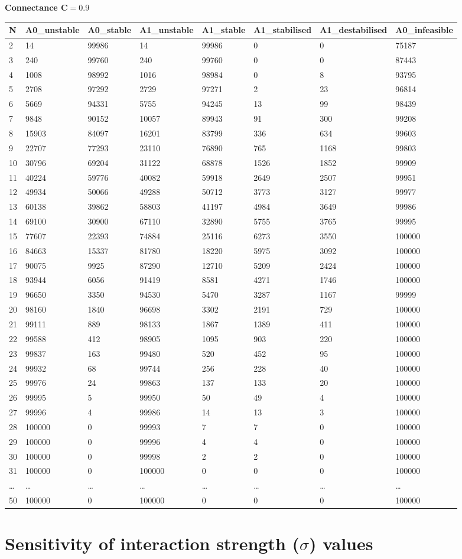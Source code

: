 \documentclass[]{article}
\begin{document}
\textbf{Connectance \(\mathbf{C = 0.9}\)}

\begin{longtable}[]{@{}llllllll@{}}
\toprule
N & A0\_unstable & A0\_stable & A1\_unstable & A1\_stable &
A1\_stabilised & A1\_destabilised & A0\_infeasible\tabularnewline
\midrule
\endhead
2 & 14 & 99986 & 14 & 99986 & 0 & 0 & 75187\tabularnewline
3 & 240 & 99760 & 240 & 99760 & 0 & 0 & 87443\tabularnewline
4 & 1008 & 98992 & 1016 & 98984 & 0 & 8 & 93795\tabularnewline
5 & 2708 & 97292 & 2729 & 97271 & 2 & 23 & 96814\tabularnewline
6 & 5669 & 94331 & 5755 & 94245 & 13 & 99 & 98439\tabularnewline
7 & 9848 & 90152 & 10057 & 89943 & 91 & 300 & 99208\tabularnewline
8 & 15903 & 84097 & 16201 & 83799 & 336 & 634 & 99603\tabularnewline
9 & 22707 & 77293 & 23110 & 76890 & 765 & 1168 & 99803\tabularnewline
10 & 30796 & 69204 & 31122 & 68878 & 1526 & 1852 & 99909\tabularnewline
11 & 40224 & 59776 & 40082 & 59918 & 2649 & 2507 & 99951\tabularnewline
12 & 49934 & 50066 & 49288 & 50712 & 3773 & 3127 & 99977\tabularnewline
13 & 60138 & 39862 & 58803 & 41197 & 4984 & 3649 & 99986\tabularnewline
14 & 69100 & 30900 & 67110 & 32890 & 5755 & 3765 & 99995\tabularnewline
15 & 77607 & 22393 & 74884 & 25116 & 6273 & 3550 & 100000\tabularnewline
16 & 84663 & 15337 & 81780 & 18220 & 5975 & 3092 & 100000\tabularnewline
17 & 90075 & 9925 & 87290 & 12710 & 5209 & 2424 & 100000\tabularnewline
18 & 93944 & 6056 & 91419 & 8581 & 4271 & 1746 & 100000\tabularnewline
19 & 96650 & 3350 & 94530 & 5470 & 3287 & 1167 & 99999\tabularnewline
20 & 98160 & 1840 & 96698 & 3302 & 2191 & 729 & 100000\tabularnewline
21 & 99111 & 889 & 98133 & 1867 & 1389 & 411 & 100000\tabularnewline
22 & 99588 & 412 & 98905 & 1095 & 903 & 220 & 100000\tabularnewline
23 & 99837 & 163 & 99480 & 520 & 452 & 95 & 100000\tabularnewline
24 & 99932 & 68 & 99744 & 256 & 228 & 40 & 100000\tabularnewline
25 & 99976 & 24 & 99863 & 137 & 133 & 20 & 100000\tabularnewline
26 & 99995 & 5 & 99950 & 50 & 49 & 4 & 100000\tabularnewline
27 & 99996 & 4 & 99986 & 14 & 13 & 3 & 100000\tabularnewline
28 & 100000 & 0 & 99993 & 7 & 7 & 0 & 100000\tabularnewline
29 & 100000 & 0 & 99996 & 4 & 4 & 0 & 100000\tabularnewline
30 & 100000 & 0 & 99998 & 2 & 2 & 0 & 100000\tabularnewline
31 & 100000 & 0 & 100000 & 0 & 0 & 0 & 100000\tabularnewline
\ldots{} & \ldots{} & \ldots{} & \ldots{} & \ldots{} & \ldots{} &
\ldots{} & \ldots{}\tabularnewline
50 & 100000 & 0 & 100000 & 0 & 0 & 0 & 100000\tabularnewline
\bottomrule
\end{longtable}

\hypertarget{sigma}{\section{\texorpdfstring{Sensitivity of interaction
strength (\(\sigma\))
values}{Sensitivity of interaction strength (\textbackslash{}sigma) values}}\label{sigma}}
\end{document}
